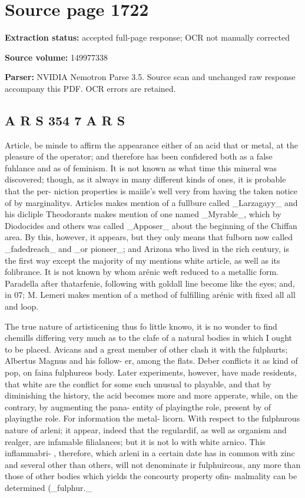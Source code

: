 \clearpage
\section{Source page 1722}
\textbf{Extraction status:} accepted full-page response; OCR not manually corrected\par
\textbf{Source volume:} 149977338\par
\textbf{Parser:} NVIDIA Nemotron Parse 3.5. Source scan and unchanged raw response accompany this PDF. OCR errors are retained.\par\medskip
\subsection*{A R S 354 7 A R S}
Article, be minde to affirm the appearance either of an acid that or metal, at the pleasure of the operator; and therefore has been confidered both as a false fuhlance and as of feminism. It is not known as what time this mineral was discovered; though, as it always in many different kinds of ones, it is probable that the per- niction properties is maiile’s well very from having the taken notice of by marginalitys. Articles makes mention of a fullbure called \_Larzagayy\_ and his dicliple Theodorants makes mention of one named \_Myrable\_, which by Diodocides and others was called \_Apposer\_ about the beginning of the Chiffan area. By this, however, it appears, but they only means that fulborn now called \_fadedreach\_ and \_or pioneer\_; and Arizona who lived in the rich century, is the first way except the majority of my mentions white article, as well as its folibrance. It is not known by whom arénic weft reduced to a metallic form. Paradella after thatarfenie, following with goldall line become like the eyes; and, in 07; M. Lemeri makes mention of a method of fulfilling arénic with fixed all all and loop.\par\medskip
The true nature of artisticening thus fo little knowo, it is no wonder to find chemills differing very much as to the clafe of a natural bodies in which I ought to be placed. Avicans and a great member of other clash it with the fulphurts; Albertus Magnus and his follow- er, among the flats. Deber conflicts it as kind of pop, on faina fulphureos body. Later experiments, however, have made residents, that white are the conflict for some such unusual to playable, and that by diminishing the history, the acid becomes more and more apperate, while, on the contrary, by augmenting the pana- entity of playingthe role, present by of playingthe role. For information the metal- licorn. With respect to the fulphurous nature of arleni; it appear, indeed that the regulardif, as well as organism and realger, are infamable filialances; but it is not lo with white arnico. This inflammabri- , therefore, which arleni in a certain date has in common with zinc and several other than others, will not denominate ir fulphuircous, any more than those of other bodies which yields the concourty property ofin- malmality can be determined (\_fulphur.\_\par\medskip
